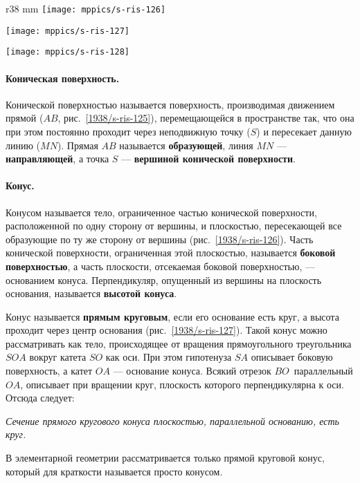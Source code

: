 {

\begin{wrapfigure}{r}{38 mm}
\vskip-0mm
\centering
\texttt{[image: mppics/s-ris-126]}
\caption{}\label{1938/s-ris-126}
\bigskip
\texttt{[image: mppics/s-ris-127]}
\caption{}\label{1938/s-ris-127}
\bigskip
\texttt{[image: mppics/s-ris-128]}
\caption{}\label{1938/s-ris-128}
\vskip-0mm
\end{wrapfigure}

\paragraph{Коническая поверхность.}\label{1938/s108}
Конической поверхностью называется поверхность, производимая движением прямой ($AB$, рис.~\ref{1938/s-ris-125}), перемещающейся в пространстве так, что она при этом постоянно проходит через неподвижную точку ($S$) и пересекает данную линию ($MN$).
Прямая $AB$ называется \textbf{образующей}, линия $MN$ — \textbf{направляющей}, а точка $S$ — \textbf{вершиной конической поверхности}.

\paragraph{Конус.}\label{1938/s109}
Конусом называется тело, ограниченное частью конической поверхности, расположенной по одну сторону от вершины, и плоскостью, пересекающей все образующие по ту же сторону от вершины (рис.~\ref{1938/s-ris-126}).
Часть конической поверхности, ограниченная этой плоскостью, называется \textbf{боковой поверхностью}, а часть плоскости, отсекаемая боковой поверхностью, — основанием конуса.
Перпендикуляр, опущенный из вершины на плоскость основания, называется \textbf{высотой конуса}.

Конус называется \textbf{прямым круговым}, если его основание есть круг, а высота проходит через центр основания (рис.~\ref{1938/s-ris-127}).
Такой конус можно рассматривать как тело, происходящее от вращения прямоугольного треугольника $SOA$ вокруг катета $SO$ как оси.
При этом гипотенуза $SA$ описывает боковую поверхность, а катет $OA$ — основание конуса.
Всякий отрезок $BO$\, параллельный $OA$, описывает при вращении круг, плоскость которого перпендикулярна к оси.
Отсюда следует:

\emph{Сечение прямого кругового конуса плоскостью, параллельной основанию, есть круг.}

В элементарной геометрии рассматривается только прямой круговой конус, который для краткости называется просто конусом.

}

